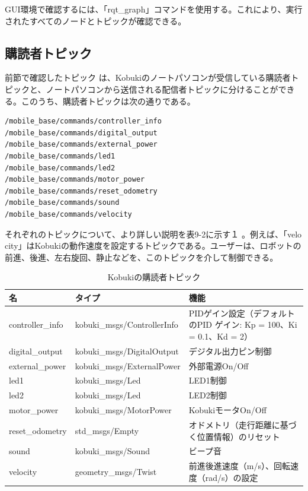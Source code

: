 \begin{itemize}
GUI環境で確認するには、「rqt\_graph」コマンドを使用する。これにより、実行されたすべてのノードとトピックが確認できる。

\subsection{購読者トピック}

前節で確認したトピック  は、Kobukiのノートパソコンが受信している購読者トピックと、ノートパソコンから送信される配信者トピックに分けることができる。このうち、購読者トピックは次の通りである。

\begin{lstlisting}[language=ROS]
/mobile_base/commands/controller_info
/mobile_base/commands/digital_output
/mobile_base/commands/external_power
/mobile_base/commands/led1
/mobile_base/commands/led2
/mobile_base/commands/motor_power
/mobile_base/commands/reset_odometry
/mobile_base/commands/sound
/mobile_base/commands/velocity
\end{lstlisting}

それぞれのトピックについて、より詳しい説明を表9-2に示す１ 。例えば、「velo\\city」はKobukiの動作速度を設定するトピックである。ユーザーは、ロボットの前進、後進、左右旋回、静止などを、このトピックを介して制御できる。

\begin{table}[htp]
\centering
\small
\begin{tabular}{p{2cm} p{5cm} p{5cm}}
\toprule
\textbf{名} & \textbf{タイプ} & \textbf{機能}\\
\midrule
controller\_info & kobuki\_msgs/ControllerInfo  &  PIDゲイン設定（デフォルトのPID ゲイン: Kp = 100、Ki = 0.1、Kd = 2）}\\
digital\_output  & kobuki\_msgs/DigitalOutput & デジタル出力ピン制御 \\
external\_power  & kobuki\_msgs/ExternalPower & 外部電源On/Off \\
led1 & kobuki\_msgs/Led & LED1制御 \\
led2  & kobuki\_msgs/Led & LED2制御 \\
motor\_power & kobuki\_msgs/MotorPower  & KobukiモータOn/Off \\
reset\_odometry  & std\_msgs/Empty  & オドメトリ（走行距離に基づく位置情報）のリセット \\
sound & kobuki\_msgs/Sound & ビープ音 \\
velocity  & geometry\_msgs/Twist & 前進後進速度（m/s）、回転速度（rad/s）の設定 \\
\bottomrule
\end{tabular}
\caption{Kobukiの購読者トピック}
\end{table}


\end{itemize}

